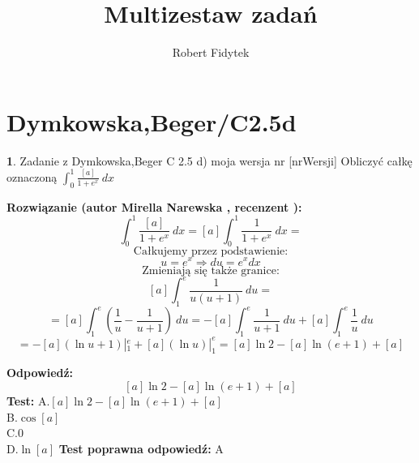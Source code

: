 \documentclass[12pt, a4paper]{article}
\title{Multizestaw zadań}
\author{Robert Fidytek}
\date{}
\theoremstyle{definition} %
\newtheorem{zad}{}
\newcommand{\kategoria}[1]{\section{#1}} %
\newcommand{\zadStart}[1]{\begin{zad}#1\newline} %
\newcommand{\zadStop}{\end{zad}}   %
\newcommand{\rozwStart}[2]{\noindent \textbf{Rozwiązanie (autor #1 , recenzent #2): }\newline} %
\newcommand{\odpStart}{\noindent \textbf{Odpowiedź:}\newline}    %
\newcommand{\odpStop}{\newline}                                             %
\newcommand{\testStart}{\noindent \textbf{Test:}\newline} %
\newcommand{\testStop}{\newline} %
\newcommand{\kluczStart}{\noindent \textbf{Test poprawna odpowiedź:}\newline} %
\newcommand{\kluczStop}{\newline} %
\begin{document}
\maketitle



\kategoria{Dymkowska,Beger/C2.5d}
\zadStart{Zadanie z Dymkowska,Beger C 2.5 d) moja wersja nr [nrWersji]}
Obliczyć całkę oznaczoną $\displaystyle \int_{0}^{1} \frac{[a]}{1+e^x} \ dx $
\zadStop
\rozwStart{Mirella Narewska}{}
$$\int_{0}^{1} \frac{[a]}{1+e^x} \ dx  = [a]  \int_{0}^{1} \frac{1}{1+e^x} \ dx = $$
$$\text{Całkujemy przez podstawienie:}$$
$$u=e^x \Rightarrow du=e^x dx$$
$$\text{Zmieniają się także granice:}$$
$$ [a]\int_{1}^{e} \frac{1}{u(u+1)} \ du=$$
$$=[a]\int_{1}^{e} \left(\frac{1}{u}-\frac{1}{u+1}\right) \ du=-[a]\int_{1}^{e}\frac{1}{u+1} \ du +[a]\int_{1}^{e}\frac{1}{u} \ du$$
$$=-[a]\left(\ln{u+1}\right)|_{1}^{e}+[a]\left(\ln{u}\right)|_{1}^{e}=[a]\ln{2}-[a]\ln{(e+1)}+[a]$$

\odpStart
$$[a]\ln{2}-[a]\ln{(e+1)}+[a]$$
\odpStop
\testStart
A.$[a]\ln{2}-[a]\ln{(e+1)}+[a]$
\\
B.$\cos{[a]}$
\\
C.$0$
\\
D.$\ln{[a]}$
\testStop
\kluczStart
A
\kluczStop
\end{document}
